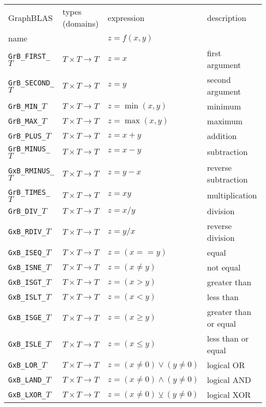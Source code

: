 \documentclass[12pt]{article}
\begin{document}
\vspace{0.2in}
{\footnotesize
\begin{tabular}{llll}
\hline
GraphBLAS             & types (domains)            & expression      & description \\
name                  &                            & $z=f(x,y)$      & \\
\hline
\verb'GrB_FIRST_'$T$  & $T \times T \rightarrow T$ & $z = x$         & first argument \\
\verb'GrB_SECOND_'$T$ & $T \times T \rightarrow T$ & $z = y$         & second argument \\
\verb'GrB_MIN_'$T$    & $T \times T \rightarrow T$ & $z = \min(x,y)$ & minimum \\
\verb'GrB_MAX_'$T$    & $T \times T \rightarrow T$ & $z = \max(x,y)$ & maximum \\
\verb'GrB_PLUS_'$T$   & $T \times T \rightarrow T$ & $z = x+y$       & addition \\
\verb'GrB_MINUS_'$T$  & $T \times T \rightarrow T$ & $z = x-y$       & subtraction \\
\verb'GxB_RMINUS_'$T$ & $T \times T \rightarrow T$ & $z = y-x$       & reverse subtraction \\
\verb'GrB_TIMES_'$T$  & $T \times T \rightarrow T$ & $z = xy$        & multiplication \\
\verb'GrB_DIV_'$T$    & $T \times T \rightarrow T$ & $z = x/y$       & division \\
\verb'GxB_RDIV_'$T$   & $T \times T \rightarrow T$ & $z = y/x$       & reverse division \\
\hline
\verb'GxB_ISEQ_'$T$   & $T \times T \rightarrow T$ & $z = (x == y)$  & equal \\
\verb'GxB_ISNE_'$T$   & $T \times T \rightarrow T$ & $z = (x \ne y)$ & not equal \\
\verb'GxB_ISGT_'$T$   & $T \times T \rightarrow T$ & $z = (x >   y)$ & greater than \\
\verb'GxB_ISLT_'$T$   & $T \times T \rightarrow T$ & $z = (x <   y)$ & less than  \\
\verb'GxB_ISGE_'$T$   & $T \times T \rightarrow T$ & $z = (x \ge y)$ & greater than or equal \\
\verb'GxB_ISLE_'$T$   & $T \times T \rightarrow T$ & $z = (x \le y)$ & less than or equal  \\
\hline
\verb'GxB_LOR_'$T$    & $T \times T \rightarrow T$ & $z = (x \ne 0) \vee    (y \ne 0) $ & logical OR \\
\verb'GxB_LAND_'$T$   & $T \times T \rightarrow T$ & $z = (x \ne 0) \wedge  (y \ne 0) $ & logical AND \\
\verb'GxB_LXOR_'$T$   & $T \times T \rightarrow T$ & $z = (x \ne 0) \veebar (y \ne 0) $ & logical XOR \\
\hline
\end{tabular}
}
\vspace{0.2in}
\end{document}
